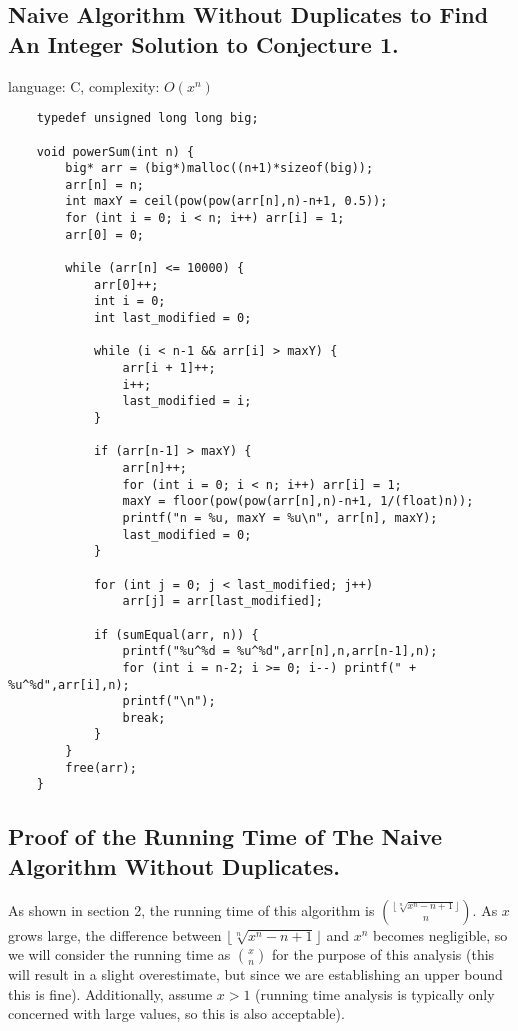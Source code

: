 \documentclass{article}
\begin{document}
\begin{flushleft}
\subsection{Naive Algorithm Without Duplicates to Find An Integer Solution to Conjecture 1.}
language: C, complexity: $O(x^n)$
\begin{lstlisting}
    typedef unsigned long long big;

    void powerSum(int n) {
        big* arr = (big*)malloc((n+1)*sizeof(big));
        arr[n] = n;
        int maxY = ceil(pow(pow(arr[n],n)-n+1, 0.5));
        for (int i = 0; i < n; i++) arr[i] = 1;
        arr[0] = 0;

        while (arr[n] <= 10000) {
            arr[0]++;
            int i = 0;
            int last_modified = 0;

            while (i < n-1 && arr[i] > maxY) {
                arr[i + 1]++;
                i++;
                last_modified = i;
            }
    
            if (arr[n-1] > maxY) {
                arr[n]++;
                for (int i = 0; i < n; i++) arr[i] = 1;
                maxY = floor(pow(pow(arr[n],n)-n+1, 1/(float)n));
                printf("n = %u, maxY = %u\n", arr[n], maxY);
                last_modified = 0;
            }
    
            for (int j = 0; j < last_modified; j++) 
                arr[j] = arr[last_modified];
    
            if (sumEqual(arr, n)) {
                printf("%u^%d = %u^%d",arr[n],n,arr[n-1],n);
                for (int i = n-2; i >= 0; i--) printf(" + %u^%d",arr[i],n);
                printf("\n");
                break;
            }
        }
        free(arr);
    }
\end{lstlisting}

\subsection{Proof of the Running Time of The Naive Algorithm Without Duplicates.}
As shown in section 2, the running time of this algorithm is ${\lfloor\sqrt[n]{x^n - n + 1}\rfloor \choose n}$. As $x$ grows large, the difference between $\lfloor\sqrt[n]{x^n - n + 1}\rfloor$ and $x^n$ becomes negligible, so we will consider the running time as ${x \choose n}$ for the purpose of this analysis (this will result in a slight overestimate, but since we are establishing an upper bound this is fine). Additionally, assume $x > 1$ (running time analysis is typically only concerned with large values, so this is also acceptable).


\end{flushleft}
\end{document}
